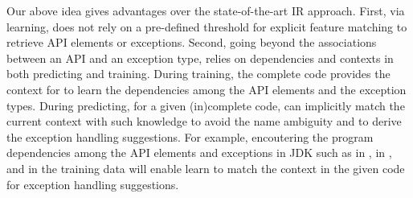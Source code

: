
Our above idea gives {\tool} advantages over the state-of-the-art IR
approach. First,
via learning, {\tool} does not rely on a pre-defined threshold for
explicit feature matching to retrieve API elements or
exceptions. Second,
going beyond the associations between an API and an exception type,
{\tool} relies on dependencies and contexts
in both predicting and training. During training, the complete code
provides the context for {\tool} to learn the dependencies among the
API elements and the exception types. During predicting, for a given
(in)complete code, {\tool} can implicitly match the current context
with such knowledge to avoid the name ambiguity and to derive the
exception handling suggestions.
%
For example, encoutering the program dependencies among the API
elements and exceptions in JDK such as  in
,  in ,
and  in the training data will enable
{\tool} learn to match the context in the given code for
exception handling suggestions.


